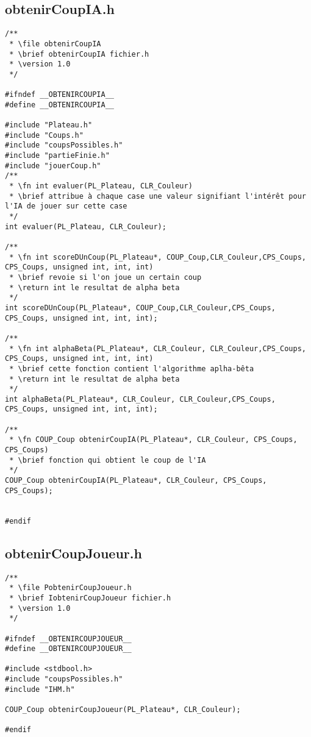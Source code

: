 \subsection{obtenirCoupIA.h}
\begin{lstlisting}
/**
 * \file obtenirCoupIA
 * \brief obtenirCoupIA fichier.h
 * \version 1.0
 */

#ifndef __OBTENIRCOUPIA__
#define __OBTENIRCOUPIA__

#include "Plateau.h"
#include "Coups.h"
#include "coupsPossibles.h"
#include "partieFinie.h"
#include "jouerCoup.h"
/**
 * \fn int evaluer(PL_Plateau, CLR_Couleur)
 * \brief attribue à chaque case une valeur signifiant l'intérêt pour l'IA de jouer sur cette case
 */
int evaluer(PL_Plateau, CLR_Couleur);

/**
 * \fn int scoreDUnCoup(PL_Plateau*, COUP_Coup,CLR_Couleur,CPS_Coups, CPS_Coups, unsigned int, int, int)
 * \brief revoie si l'on joue un certain coup
 * \return int le resultat de alpha beta
 */
int scoreDUnCoup(PL_Plateau*, COUP_Coup,CLR_Couleur,CPS_Coups, CPS_Coups, unsigned int, int, int);

/**
 * \fn int alphaBeta(PL_Plateau*, CLR_Couleur, CLR_Couleur,CPS_Coups, CPS_Coups, unsigned int, int, int)
 * \brief cette fonction contient l'algorithme aplha-bêta
 * \return int le resultat de alpha beta
 */
int alphaBeta(PL_Plateau*, CLR_Couleur, CLR_Couleur,CPS_Coups, CPS_Coups, unsigned int, int, int);

/**
 * \fn COUP_Coup obtenirCoupIA(PL_Plateau*, CLR_Couleur, CPS_Coups, CPS_Coups)
 * \brief fonction qui obtient le coup de l'IA
 */
COUP_Coup obtenirCoupIA(PL_Plateau*, CLR_Couleur, CPS_Coups, CPS_Coups);


#endif
\end{lstlisting}

\subsection{obtenirCoupJoueur.h}
\begin{lstlisting}
/**
 * \file PobtenirCoupJoueur.h
 * \brief IobtenirCoupJoueur fichier.h
 * \version 1.0
 */

#ifndef __OBTENIRCOUPJOUEUR__
#define __OBTENIRCOUPJOUEUR__

#include <stdbool.h>
#include "coupsPossibles.h"
#include "IHM.h"

COUP_Coup obtenirCoupJoueur(PL_Plateau*, CLR_Couleur);

#endif
\end{lstlisting}

